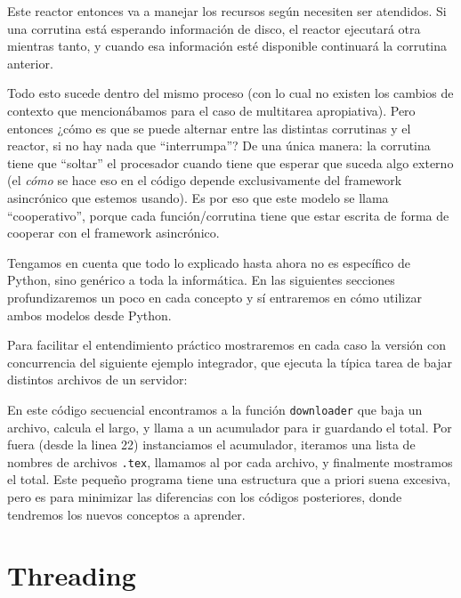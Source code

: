 Este reactor entonces va a manejar los recursos según necesiten ser atendidos. Si una corrutina está esperando información de disco, el reactor ejecutará otra mientras tanto, y cuando esa información esté disponible continuará la corrutina anterior. 

Todo esto sucede dentro del mismo proceso (con lo cual no existen los cambios de contexto que mencionábamos para el caso de multitarea apropiativa). Pero entonces ¿cómo es que se puede alternar entre las distintas corrutinas y el reactor, si no hay nada que ``interrumpa''? De una única manera: la corrutina tiene que ``soltar'' el procesador cuando tiene que esperar que suceda algo externo (el \textit{cómo} se hace eso en el código depende exclusivamente del framework asincrónico que estemos usando). Es por eso que este modelo se llama ``cooperativo'', porque cada función/corrutina tiene que estar escrita de forma de cooperar con el framework asincrónico.

Tengamos en cuenta que todo lo explicado hasta ahora no es específico de Python, sino genérico a toda la informática. En las siguientes secciones profundizaremos un poco en cada concepto y sí entraremos en cómo utilizar ambos modelos desde Python. 

Para facilitar el entendimiento práctico mostraremos en cada caso la versión con concurrencia del siguiente ejemplo integrador, que ejecuta la típica tarea de bajar distintos archivos de un servidor:


En este código secuencial encontramos a la función \texttt{downloader} que baja un archivo, calcula el largo, y llama a un acumulador para ir guardando el total. Por fuera (desde la linea 22) instanciamos el acumulador, iteramos una lista de nombres de archivos \texttt{.tex}, llamamos al  por cada archivo, y finalmente mostramos el total. Este pequeño programa tiene una estructura que a priori suena excesiva, pero es para minimizar las diferencias con los códigos posteriores, donde tendremos los nuevos conceptos a aprender.



\section{Threading}\label{sec:multithreading}

